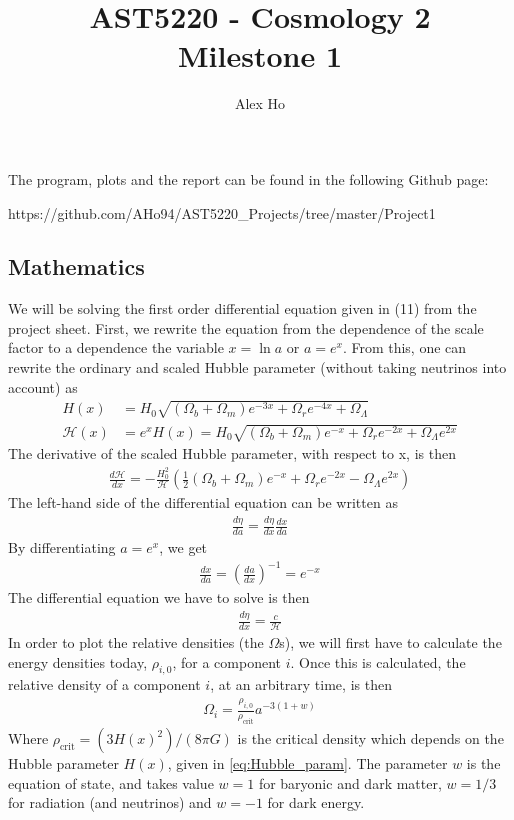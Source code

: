 \documentclass[12pt]{article}
\author{Alex Ho}
\title{AST5220 - Cosmology 2 \\ Milestone 1}
\begin{document}
\maketitle
The program, plots and the report can be found in the following Github page:

https://github.com/AHo94/AST5220\_Projects/tree/master/Project1
\subsection*{Mathematics}
We will be solving the first order differential equation given in (11) from the project sheet. First, we rewrite the equation from the dependence of the scale factor to a dependence the variable $x=\ln a$ or $a = e^x$. From this, one can rewrite the ordinary and scaled Hubble parameter (without taking neutrinos into account) as
\begin{align}
H(x) &= H_0 \sqrt{(\Omega_b + \Omega_m)e^{-3x} + \Omega_r e^{-4x} + \Omega_{\Lambda}} \label{eq:Hubble_param} \\
\mathcal{H}(x) &=e^{x}H(x) = H_0\sqrt{(\Omega_b + \Omega_m)e^{-x} + \Omega_re^{-2x} + \Omega_{\Lambda}e^{2x}}
\end{align}
The derivative of the scaled Hubble parameter, with respect to x, is then
\begin{align*}
\frac{d\mathcal{H}}{dx} = -\frac{H_0^2}{\mathcal{H}}\left( \frac{1}{2}(\Omega_b + \Omega_m)e^{-x} + \Omega_r e^{-2x}  -\Omega_{\Lambda}e^{2x}\right)
\end{align*}
The left-hand side of the differential equation can be written as
\begin{align}
\frac{d\eta}{da} = \frac{d\eta}{dx}\frac{dx}{da}
\end{align}
By differentiating $a=e^{x}$, we get
\begin{align}
\frac{dx}{da} = \left(\frac{da}{dx} \right)^{-1} = e^{-x}
\end{align}
The differential equation we have to solve is then
\begin{align}
\frac{d\eta}{dx} = \frac{c}{\mathcal{H}}
\label{eq:Differential_eq_eta}
\end{align}
In order to plot the relative densities (the $\Omega$s), we will first have to calculate the energy densities today, $\rho_{i,0}$, for a component $i$. Once this is calculated, the relative density of a component $i$, at an arbitrary time, is then
\begin{align}
\Omega_i = \frac{\rho_{i,0}}{\rho_{\text{crit}}}a^{-3(1+w)}
\end{align}
Where $\rho_{\text{crit}} = (3H(x)^2)/(8\pi G)$ is the critical density which depends on the Hubble parameter $H(x)$, given in \ref{eq:Hubble_param}. The parameter $w$ is the equation of state, and takes value $w=1$ for baryonic and dark matter, $w=1/3$ for radiation (and neutrinos) and $w=-1$ for dark energy.
\end{document}
